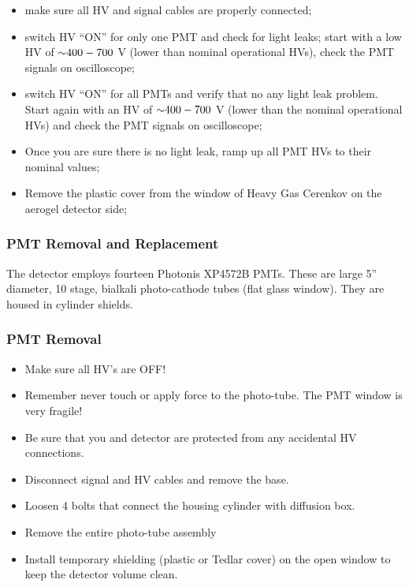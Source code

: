 {\begin{itemize}
\item make sure all HV and
  signal cables are properly connected;
\item switch HV ``ON'' for only one
  PMT and check for light leaks; start with a low HV of $\mathord{\sim} 400-700$ V
  (lower than nominal operational HVs), check the PMT signals on
  oscilloscope;
\item switch HV ``ON'' for all PMTs and verify that no any
  light leak problem. Start again with an HV of $\mathord{\sim} 400-700$ V (lower than
  the nominal operational HVs) and check the PMT signals on
  oscilloscope;
\item Once you are sure there is no light leak, ramp up all
  PMT HVs to their nominal values;
\item Remove the plastic cover from
  the window of Heavy Gas Cerenkov on the aerogel detector side;
\end{itemize}

\subsubsection{PMT Removal and Replacement}

The detector employs fourteen Photonis XP4572B PMTs. These are large
5'' diameter, 10 stage, bialkali photo-cathode tubes (flat glass
window). They are housed in cylinder shields.

\subsubsection*{PMT Removal}

\begin{itemize}
\item Make sure all HV’s are OFF!
\item Remember never touch or apply force to the photo-tube. The PMT
  window is very fragile!
\item Be sure that you and detector are
  protected from any accidental HV connections.
\item Disconnect signal
  and HV cables and remove the base.
\item Loosen 4 bolts that connect
  the housing cylinder with diffusion box.
\item Remove the entire
  photo-tube assembly
\item Install temporary shielding (plastic or Tedlar
  cover) on the open window to keep the detector volume clean.
\end{itemize}

}
